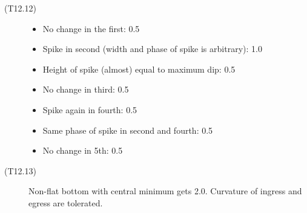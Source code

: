 \begin{description}
\item[(T12.12)]
\begin{itemize}
\item No change in the first: 0.5
\item Spike in second (width and phase of spike is arbitrary): 1.0
\item Height of spike (almost) equal to maximum dip: 0.5
\item No change in third: 0.5
\item Spike again in fourth: 0.5
\item Same phase of spike in second and fourth: 0.5
\item No change in 5th: 0.5
\end{itemize}

\item[(T12.13)]
Non-flat bottom with central minimum gets 2.0. Curvature of ingress and
egress are tolerated.
\end{description}
